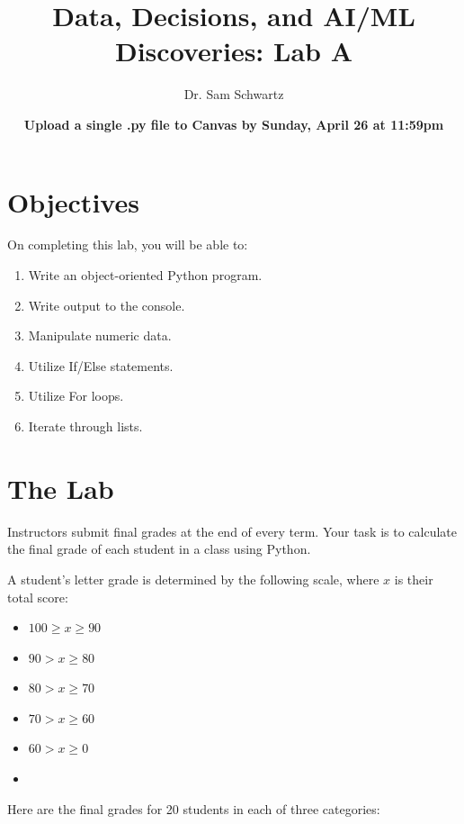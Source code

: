 \documentclass{article}
\title{Data, Decisions, and AI/ML Discoveries: Lab A}
\date{\textbf{Upload a single .py file to Canvas by Sunday, April 26 at 11:59pm}}
\author{Dr. Sam Schwartz}
\begin{document}
	
	\maketitle
	
	

\section{Objectives}
On completing this lab, you will be able to:

\begin{enumerate}
	\item Write an object-oriented Python program.
	\item Write output to the console.
	\item Manipulate numeric data.
	\item Utilize If/Else statements.
	\item Utilize For loops.
	\item Iterate through lists.
\end{enumerate}

\section{The Lab}

Instructors submit final grades at the end of every term. Your task is to calculate the final grade of each student in a class using Python.

A student's letter grade is determined by the following scale, where $x$ is their total score:
\begin{itemize}
	\setlength\itemsep{0em}
	\item[A] $100\ge x \ge 90$
	\item[B] $90> x \ge 80$
	\item[C] $80> x \ge 70$
	\item[D] $70> x \ge 60$
	\item[F] $60> x \ge 0$
	\item[]
\end{itemize}


Here are the final grades for 20 students in each of three categories:
\end{document}
